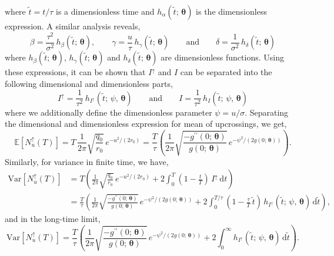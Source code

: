 \documentclass[journal]{IEEEtran}
\theoremstyle{plain}
\theoremstyle{definition}
\theoremstyle{remark}
\newcommand{\E}{\mathbb{E}}
\newcommand{\Iup}{I^\uparrow}
\newcommand{\Nup}{N_u^{\uparrow}(T)}
\newcommand{\btheta}{\boldsymbol{\theta}}
\newcommand{\dd}{\mathrm{d}}
\newcommand{\Var}{\text{Var}}
\begin{document}
where $\tilde{t} = t/\tau$ is a dimensionless time and $h_\alpha\left(\tilde{t};\, \btheta\right)$ is the dimensionless expression. A similar analysis reveals,
\begin{equation}
    \beta = \frac{\tau^2}{\sigma^2} \, h_\beta\left(\tilde{t}; \, \btheta\right), \qquad \gamma = \frac{u}{\tau} \, h_\gamma\left(\tilde{t}; \, \btheta\right) \qquad \text{and} \qquad \delta = \frac{1}{\sigma^2} \, h_\delta\left(\tilde{t}; \, \btheta\right)
\end{equation}
where $h_\beta\left(\tilde{t};\, \btheta\right)$, $h_\gamma\left(\tilde{t};\, \btheta\right)$ and $h_\delta\left(\tilde{t};\, \btheta\right)$ are dimensionless functions. Using these expressions, it can be shown that $\Iup$ and $I$ can be separated into the following dimensional and dimensionless parts,
\begin{equation}
    \Iup = \frac{1}{\tau^2} \, h_{\Iup}\left(\tilde{t};\, \psi, \, \btheta\right) \qquad \text{and} \qquad I = \frac{1}{\tau^2} \, h_{I}\left(\tilde{t};\, \psi, \, \btheta\right)
\end{equation}
where we additionally define the dimensionless parameter $\psi = u / \sigma$. Separating the dimensional and dimensionless expression for mean of upcrossings, we get,
\begin{equation}
    \E\left[\Nup\right] = T \,\frac{1}{2\pi}\sqrt{\frac{q_0}{r_0}} \, e^{-u^2/(2r_0)} = \frac{T}{\tau}\left( \frac{1}{2\pi}\sqrt{\frac{-g^{\prime\prime}\left(0;\,\btheta\right)}{g\left(0;\,\btheta\right)}} \, e^{-\psi^2/(2g\left(0;\,\btheta\right))}\right).
\end{equation}
Similarly, for variance in finite time, we have,
\begin{equation}
\begin{split}
    \Var\left[\Nup\right] &= T \left(\frac{1}{2\pi}\sqrt{\frac{q_0}{r_0}} \, e^{-u^2/(2r_0)} + 2\int_{0}^T \left(1-\frac{t}{T}\right)  \, \Iup \, \dd t\right) \\
    &= \frac{T}{\tau} \left(\frac{1}{2\pi}\sqrt{\frac{-g^{\prime\prime}\left(0;\,\btheta\right)}{g\left(0;\,\btheta\right)}} \, e^{-\psi^2/(2g\left(0;\,\btheta\right))} + 2\int_{0}^{T/\tau} \left(1-\frac{\tau}{T} \, \tilde{t}\right)  \,  h_{\Iup}\left(\tilde{t};\, \psi, \, \btheta\right) \, \dd \tilde{t}\right),
\end{split}
\end{equation}
and in the long-time limit,
\begin{equation}
    \Var\left[\Nup\right] = \frac{T}{\tau} \left(\frac{1}{2\pi}\sqrt{\frac{-g^{\prime\prime}\left(0;\,\btheta\right)}{g\left(0;\,\btheta\right)}} \, e^{-\psi^2/(2g\left(0;\,\btheta\right))} + 2\int_{0}^{\infty}   h_{\Iup}\left(\tilde{t};\, \psi, \, \btheta\right) \, \dd \tilde{t}\right).
\end{equation}
\end{document}
